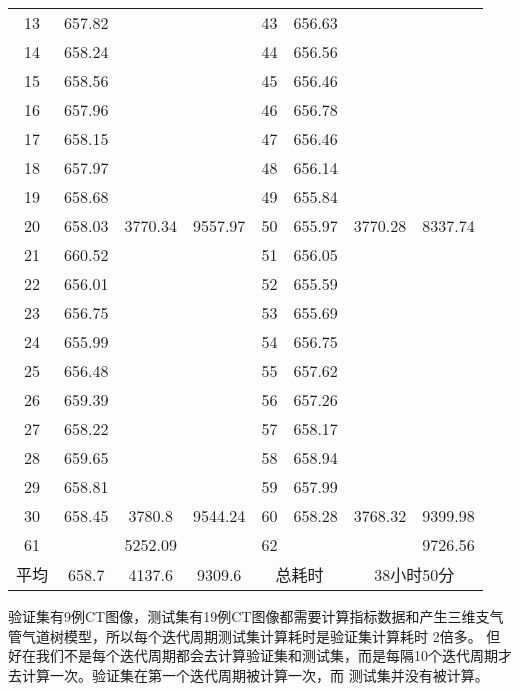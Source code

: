\begin{table}[ht]
{\begin{tabular}{c|c|c|c||c|c|c|c}
        13	& 657.82	&           &          &   43	& 656.63	&           &         \\             	
        14	& 658.24	&           &          &   44	& 656.56	&           &         \\             	
        15	& 658.56	&           &          &   45	& 656.46	&           &         \\             	
        16	& 657.96	&           &          &   46	& 656.78	&           &         \\             	
        17	& 658.15	&           &          &   47	& 656.46	&           &         \\             	
        18	& 657.97	&           &          &   48	& 656.14	&           &         \\             	
        19	& 658.68	&           &          &   49	& 655.84	&           &         \\             	
        20	& 658.03	& 3770.34	& 9557.97  &   50	& 655.97	& 3770.28	& 8337.74 \\ 
        \hline
        21	& 660.52	&           &          &   51	& 656.05	&           &         \\  	
        22	& 656.01	&           &          &   52	& 655.59	&           &         \\  	
        23	& 656.75	&           &          &   53	& 655.69	&           &         \\  	
        24	& 655.99	&           &          &   54	& 656.75	&           &         \\  	
        25	& 656.48	&           &          &   55	& 657.62	&           &         \\  	
        26	& 659.39	&           &          &   56	& 657.26	&           &         \\  	
        27	& 658.22	&           &          &   57	& 658.17	&           &         \\  	
        28	& 659.65	&           &          &   58	& 658.94	&           &         \\  	
        29	& 658.81	&           &          &   59	& 657.99	&           &         \\  	
        30	& 658.45	& 3780.8	& 9544.24  &   60	& 658.28	& 3768.32	& 9399.98 \\ 	 	 	 	 	 	 	  	 	 	 	 	 	 	 	 	 	 	 	 	 	 	 	 	 	 	
        \hline
        61	&	        & 5252.09	&          &   62   &           &           & 9726.56 \\
        \hline
        \hline
        平均 & 658.7     & 4137.6    & 9309.6   & \multicolumn{2}{|c|}{总耗时} & \multicolumn{2}{|c}{38小时50分} \\
        \hline
    \end{tabular}
    }
\end{table}
验证集有9例CT图像，测试集有19例CT图像都需要计算指标数据和产生三维支气管气道树模型，所以每个迭代周期测试集计算耗时是验证集计算耗时
2倍多。 但好在我们不是每个迭代周期都会去计算验证集和测试集，而是每隔10个迭代周期才去计算一次。验证集在第一个迭代周期被计算一次，而
测试集并没有被计算。

